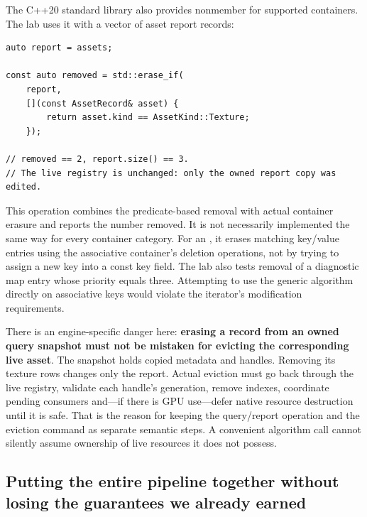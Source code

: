 The C++20 standard library also provides nonmember  for supported containers. The lab uses it with a vector of asset report records:

\begin{verbatim}
auto report = assets;

const auto removed = std::erase_if(
    report,
    [](const AssetRecord& asset) {
        return asset.kind == AssetKind::Texture;
    });

// removed == 2, report.size() == 3.
// The live registry is unchanged: only the owned report copy was edited.
\end{verbatim}

This operation combines the predicate-based removal with actual container erasure and reports the number removed. It is not necessarily implemented the same way for every container category. For an , it erases matching key/value entries using the associative container's deletion operations, not by trying to assign a new key into a const key field. The lab also tests removal of a diagnostic map entry whose priority equals three. Attempting to use the generic  algorithm directly on associative keys would violate the iterator's modification requirements.

There is an engine-specific danger here: \textbf{erasing a record from an owned query snapshot must not be mistaken for evicting the corresponding live asset}. The snapshot holds copied metadata and handles. Removing its texture rows changes only the report. Actual eviction must go back through the live registry, validate each handle's generation, remove indexes, coordinate pending consumers and---if there is GPU use---defer native resource destruction until it is safe. That is the reason for keeping the query/report operation and the eviction command as separate semantic steps. A convenient algorithm call cannot silently assume ownership of live resources it does not possess.

\subsection{Putting the entire pipeline together without losing the guarantees we already earned}\label{01-foundations-i-ch006-putting-the-entire-pipeline-together-without-losing-the-guarantees-we-already-earned}

